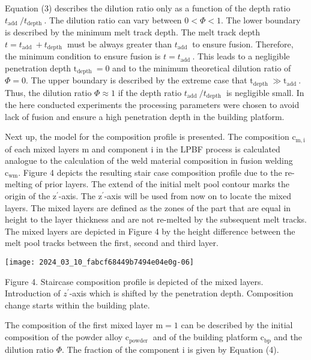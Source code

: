 \documentclass[10pt]{article}
\begin{document}
Equation (3) describes the dilution ratio only as a function of the depth ratio $t_{\text {add }} / t_{\text {depth }}$. The dilution ratio can vary between $0<\Phi<1$. The lower boundary is described by the minimum melt track depth. The melt track depth $t=t_{\text {add }}+t_{\text {depth }}$ must be always greater than $t_{\text {add }}$ to ensure fusion. Therefore, the minimum condition to ensure fusion is $t=t_{\text {add }}$. This leads to a negligible penetration depth $\mathrm{t}_{\text {depth }}=0$ and to the minimum theoretical dilution ratio of $\Phi=0$. The upper boundary is described by the extreme case that $\mathrm{t}_{\text {depth }} \gg \mathrm{t}_{\text {add }}$. Thus, the dilution ratio $\Phi \approx 1$ if the depth ratio $t_{\text {add }} / t_{\text {depth }}$ is negligible small. In the here conducted experiments the processing parameters were chosen to avoid lack of fusion and ensure a high penetration depth in the building platform.

Next up, the model for the composition profile is presented. The composition $\mathrm{c}_{\mathrm{m}, \mathrm{i}}$ of each mixed layers $\mathrm{m}$ and component $\mathrm{i}$ in the LPBF process is calculated analogue to the calculation of the weld material composition in fusion welding $\mathrm{c}_{\mathrm{wm}}$. Figure 4 depicts the resulting stair case composition profile due to the re-melting of prior layers. The extend of the initial melt pool contour marks the origin of the $\mathrm{z}^{\prime}$-axis. The $\mathrm{z}^{\prime}$-axis will be used from now on to locate the mixed layers. The mixed layers are defined as the zones of the part that are equal in height to the layer thickness and are not re-melted by the subsequent melt tracks. The mixed layers are depicted in Figure 4 by the height difference between the melt pool tracks between the first, second and third layer.

\begin{center}
\texttt{[image: 2024\_03\_10\_fabcf68449b7494e04e0g-06]}
\end{center}

Figure 4. Staircase composition profile is depicted of the mixed layers. Introduction of $z^{\prime}$-axis which is shifted by the penetration depth. Composition change starts within the building plate.

The composition of the first mixed layer $\mathrm{m}=1$ can be described by the initial composition of the powder alloy $\mathrm{c}_{\text {powder }}$ and of the building platform $\mathrm{c}_{\mathrm{bp}}$ and the dilution ratio $\Phi$. The fraction of the component $\mathrm{i}$ is given by Equation (4).
\end{document}
